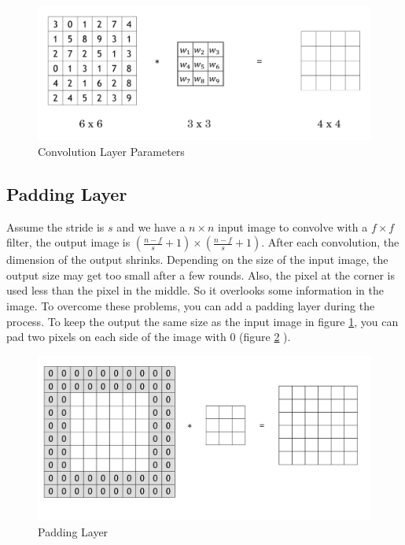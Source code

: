 \documentclass[12pt,]{krantz}
\begin{document}
\begin{figure}

{\centering \includegraphics[width=1\linewidth]{images/convlayer} 

}

\caption{Convolution Layer Parameters}\label{fig:convolutionlayer}
\end{figure}

\hypertarget{padding-layer}{%
\subsection{Padding Layer}\label{padding-layer}}

Assume the stride is \(s\) and we have a \(n \times n\) input image to convolve with a \(f \times f\) filter, the output image is \((\frac{n-f}{s} + 1) \times (\frac{n-f}{s} + 1)\). After each convolution, the dimension of the output shrinks. Depending on the size of the input image, the output size may get too small after a few rounds. Also, the pixel at the corner is used less than the pixel in the middle. So it overlooks some information in the image. To overcome these problems, you can add a padding layer during the process. To keep the output the same size as the input image in figure \ref{fig:convolutionlayer}, you can pad two pixels on each side of the image with 0 (figure \ref{fig:padding} ).

\begin{figure}

{\centering \includegraphics[width=1\linewidth]{images/padding} 

}

\caption{Padding Layer}\label{fig:padding}
\end{figure}
\end{document}
